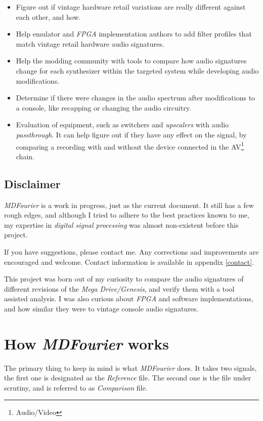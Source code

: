 \documentclass[10pt,a4paper]{report}
\begin{document}
\begin{itemize}
	\item Figure out if vintage hardware retail variations are really different against each other, and how.
	\item Help emulator and \textit{FPGA} implementation authors to add filter profiles that match vintage retail hardware audio signatures.
	\item Help the modding community with tools to compare how audio signatures change for each synthesizer within the targeted system while developing audio modifications.
	\item Determine if there were changes in the audio spectrum after modifications to a console, like recapping or changing the audio circuitry.
	\item Evaluation of equipment, such as switchers and \textit{upscalers} with audio \textit{passthrough}. It can help figure out if they have any effect on the signal, by comparing a recording with and without the device connected in the AV\footnote{Audio/Video} chain.
\end{itemize}

\newpage
\section{Disclaimer}

\textit{MDFourier} is a work in progress, just as the current document. It still has a few rough edges, and although I tried to adhere to the best practices known to me, my expertise in \textit{digital signal processing} was almost non-existent before this project. 

If you have suggestions, please contact me. Any corrections and improvements are encouraged and welcome. Contact information is available in appendix \ref{contact}.

This project was born out of my curiosity to compare the audio signatures of different revisions of the  \textit{Mega Drive/Genesis}, and verify them with a tool assisted analysis. I was also curious about \textit{FPGA} and software implementations, and how similar they were to vintage console audio signatures.

\chapter{How \textit{MDFourier} works}
\label{howitworks}

The primary thing to keep in mind is what \textit{MDFourier} does. It takes two signals, the first one is designated as the \textit{Reference} file. The second one is the file under scrutiny, and is referred to as \textit{Comparison} file. 
\end{document}
